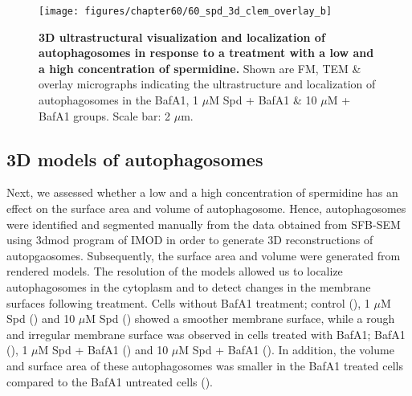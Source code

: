 \begin{landscape}
\begin{figure}[!htbp]
\center
 \texttt{[image: figures/chapter60/60\_spd\_3d\_clem\_overlay\_b]}
 \caption[3D ultrastructural visualization and localization of autophagosomes in response to a treatment with a low and a high concentration of spermidine]{\textbf{3D ultrastructural visualization and localization of autophagosomes in response to a treatment with a low and a high concentration of spermidine.} Shown are FM, TEM \& overlay micrographs indicating the ultrastructure and localization of autophagosomes in the BafA1, 1 $\mu$M Spd + BafA1 \& 10 $\mu$M + BafA1 groups. Scale bar: 2 $\mu$m.}
 \label{fig:60_spd_3d_clem_overlay_b}
\end{figure} 
\end{landscape}

\subsection{3D models of autophagosomes}
Next, we assessed whether a low and a high concentration of spermidine has an effect on the surface area and volume of autophagosome. Hence, autophagosomes were identified and segmented manually from the data obtained from SFB-SEM using 3dmod program of IMOD \citep{Kremer1996} in order to generate 3D reconstructions of autopgaosomes. Subsequently, the surface area and volume were generated from rendered models. The resolution of the models allowed us to localize autophagosomes in the cytoplasm and to detect changes in the membrane surfaces following treatment. Cells without BafA1 treatment; control (), 1 $\mu$M Spd () and 10 $\mu$M Spd () showed a smoother membrane surface, while a rough and irregular membrane surface was observed in cells treated with BafA1; BafA1 (), 1 $\mu$M Spd + BafA1 () and 10 $\mu$M Spd + BafA1 (). In addition, the volume and surface area of these autophagosomes was smaller in the BafA1 treated cells compared to the BafA1 untreated cells ().

